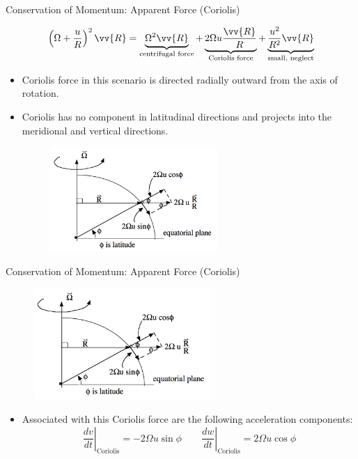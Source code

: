 \begin{frame}{Conservation of Momentum: Apparent Force (Coriolis)}

$$\left(\Omega + \frac{u}{R}\right)^2 \vv{R} = \underbrace{\Omega^2\vv{R}}_{\text{centrifugal force}} + \underbrace{2\Omega u \frac{\vv{R}}{R}}_{\text{Coriolis force}} + \underbrace{\frac{u^2}{R^2}\vv{R}}_{\text{small, neglect}}$$
\begin{itemize}
	\item Coriolis force in this scenario is directed radially outward from the axis of rotation. 
	\item Coriolis has no component in latitudinal directions and projects into the meridional and vertical directions.
	\begin{figure}
		\includegraphics[width=0.6\textwidth]{coriolis2}
	\end{figure}
\end{itemize}
\end{frame}
\begin{frame}{Conservation of Momentum: Apparent Force (Coriolis)}
\begin{figure}
		\includegraphics[width=0.6\textwidth]{coriolis2}
	\end{figure}
\begin{itemize}
	\item Associated with this Coriolis force are the following acceleration components:
	$$\left.\frac{dv}{dt}\right|_{\text{Coriolis}} = -2\Omega u \sin \phi \qquad \left.\frac{dw}{dt}\right|_{\text{Coriolis}} = 2\Omega u \cos \phi$$
\end{itemize}
\end{frame}
